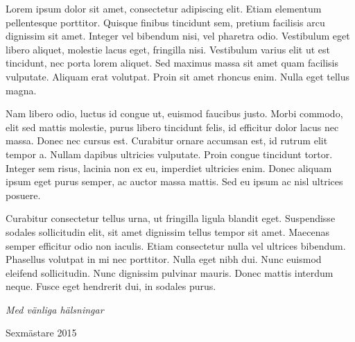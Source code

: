 \documentclass[../main/handlingar.tex]{subfiles}
\begin{document}

Lorem ipsum dolor sit amet, consectetur adipiscing elit. Etiam elementum pellentesque porttitor. Quisque finibus tincidunt sem, pretium facilisis arcu dignissim sit amet. Integer vel bibendum nisi, vel pharetra odio. Vestibulum eget libero aliquet, molestie lacus eget, fringilla nisi. Vestibulum varius elit ut est tincidunt, nec porta lorem aliquet. Sed maximus massa sit amet quam facilisis vulputate. Aliquam erat volutpat. Proin sit amet rhoncus enim. Nulla eget tellus magna.

Nam libero odio, luctus id congue ut, euismod faucibus justo. Morbi commodo, elit sed mattis molestie, purus libero tincidunt felis, id efficitur dolor lacus nec massa. Donec nec cursus est. Curabitur ornare accumsan est, id rutrum elit tempor a. Nullam dapibus ultricies vulputate. Proin congue tincidunt tortor. Integer sem risus, lacinia non ex eu, imperdiet ultricies enim. Donec aliquam ipsum eget purus semper, ac auctor massa mattis. Sed eu ipsum ac nisl ultrices posuere.

Curabitur consectetur tellus urna, ut fringilla ligula blandit eget. Suspendisse sodales sollicitudin elit, sit amet dignissim tellus tempor sit amet. Maecenas semper efficitur odio non iaculis. Etiam consectetur nulla vel ultrices bibendum. Phasellus volutpat in mi nec porttitor. Nulla eget nibh dui. Nunc euismod eleifend sollicitudin. Nunc dignissim pulvinar mauris. Donec mattis interdum neque. Fusce eget hendrerit dui, in sodales purus.

\begin{signatures}{1}
    \emph{Med vänliga hälsningar}
    \signature{Adam Waks}{Sexmästare 2015}
\end{signatures}
\end{document}
